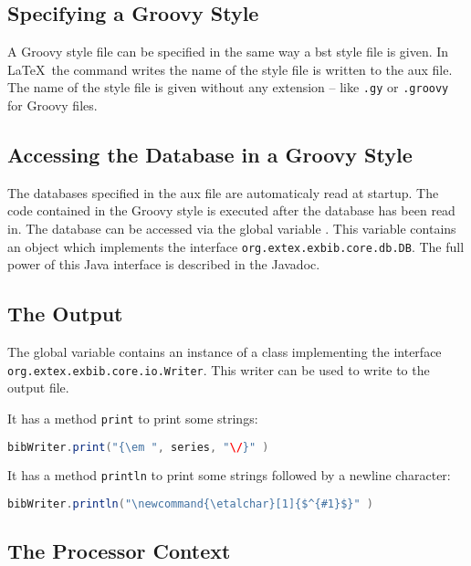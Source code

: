 \subsection{Specifying a Groovy Style}

A Groovy style file can be specified in the same way a bst style file
is given. In \LaTeX\ the command  writes the
name of the style file is written to the aux file. The name of the
style file is given without any extension -- like \verb|.gy| or
\verb|.groovy| for Groovy files.


\subsection{Accessing the Database in a Groovy Style}

The databases specified in the aux file are automaticaly read at
startup. The code contained in the Groovy style is executed after the
database has been read in. The database can be accessed via the global
variable . This variable contains an object which
implements the interface \texttt{org.extex.exbib.core.db.DB}. The full
power of this Java interface is described in the Javadoc.


\subsection{The Output}

The global variable  contains an instance of a class
implementing the interface \texttt{org.extex.exbib.core.io.Writer}.
This writer can be used to write to the output file.

It has a method \texttt{print} to print some strings:

\begin{lstlisting}[language=Java]
  bibWriter.print("{\em ", series, "\/}" )
\end{lstlisting}

It has a method \texttt{println} to print some strings followed by a
newline character:

\begin{lstlisting}[language=Java]
  bibWriter.println("\newcommand{\etalchar}[1]{$^{#1}$}" )
\end{lstlisting}


\subsection{The Processor Context}

